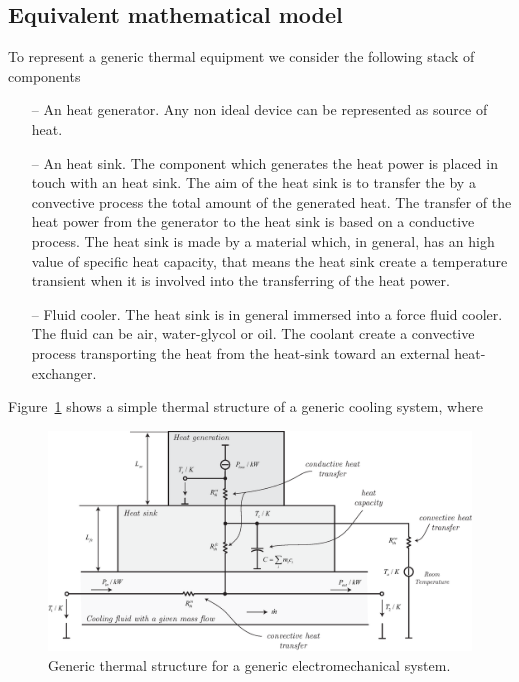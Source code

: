 \documentclass[11pt,a4paper,oneside]{book}
\numberwithin{equation}{section}
\theoremstyle{it}
\theoremstyle{definition}
\begin{document}
\subsection{Equivalent mathematical model}
To represent a generic thermal equipment we consider the following stack of components
\begin{itemize}
	\item[--] An heat generator. Any non ideal device can be represented as source of heat.	
	\item[--] An heat sink. The component which generates the heat power is placed in touch with an heat sink. The aim of the heat sink is to transfer the by a convective process the total amount of the generated heat. The transfer of the heat power from the generator to the heat sink is based on a conductive process. The heat sink is made by a material which, in general, has an high value of specific heat capacity, that means the heat sink create a temperature transient when it is involved into the transferring of the heat power. 
	\item[--] Fluid cooler. The heat sink is in general immersed into a force fluid cooler. The fluid can be air, water-glycol or oil. The coolant create a convective process transporting the heat from the heat-sink toward an external heat-exchanger.	 
\end{itemize} 
Figure~\ref{fig1} shows a simple thermal structure of a generic cooling system, where
\begin{figure}[H]
	\centering
	\includegraphics[width = 500pt, angle = 0, keepaspectratio]{figures/generic_thermal_model/generic_thermal_model_4.eps}
	\captionsetup{width=0.5\textwidth, font=small}	
	\caption{Generic thermal structure for a generic electromechanical system.}
	\label{fig1}
\end{figure}
\end{document}
